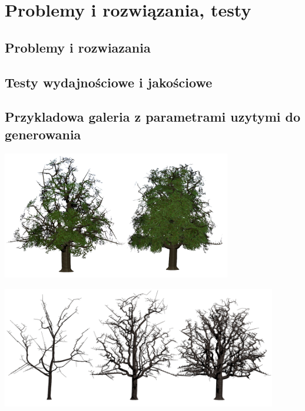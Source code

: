 
\chapter{Problemy i rozwiązania, testy}

\section{Problemy i rozwiazania}

\section{Testy wydajnościowe i jakościowe}

\section{Przykladowa galeria z parametrami uzytymi do generowania}

\begin{center}
	\includegraphics[width=100mm]{images/renders/greentree.png}
\end{center}

\begin{center}
	\includegraphics[width=120mm]{images/renders/points.png}
\end{center}


